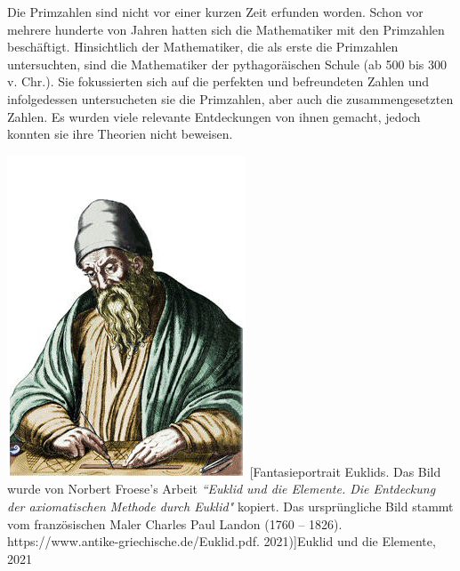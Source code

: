 \begin{minipage}{0.65\linewidth}
Die Primzahlen sind nicht vor einer kurzen Zeit erfunden
worden. Schon vor mehrere hunderte von Jahren hatten sich
die Mathematiker mit den Primzahlen beschäftigt.
Hinsichtlich der Mathematiker, die als erste die Primzahlen
untersuchten, sind die Mathematiker der pythagoräischen
Schule (ab 500 bis 300 v. Chr.). Sie fokussierten sich auf
die perfekten und befreundeten Zahlen und infolgedessen
untersucheten sie die Primzahlen, aber auch die
zusammengesetzten Zahlen. Es wurden viele relevante
Entdeckungen von ihnen gemacht, jedoch konnten sie ihre
Theorien nicht beweisen.
\end{minipage}
\hfil
\begin{minipage}[r]{0.3\linewidth}
  \captionsetup{type=figure,font=small,skip=6pt,format=plain}%
  \capstart
  \includegraphics[width=1.0\linewidth]{./images/euklid.png}
  [Fantasieportrait Euklids. Das Bild wurde von Norbert Froese's Arbeit \textit{``Euklid und die Elemente. Die Entdeckung der axiomatischen Methode durch Euklid"} kopiert. Das ursprüngliche Bild stammt vom französischen Maler Charles Paul Landon (1760 – 1826). https://www.antike-griechische.de/Euklid.pdf. 2021)]{Euklid und die Elemente, 2021}
  \label{fig:portrait_euklid}
\end{minipage}
